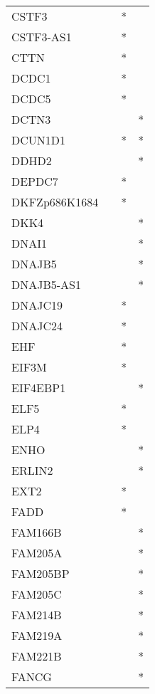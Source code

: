 \begin{longtable}{lccc}
CSTF3         &       &  * &         \\
CSTF3-AS1     &       &  * &         \\
CTTN          &       &  * &         \\
DCDC1         &       &  * &         \\
DCDC5         &       &  * &         \\
DCTN3         &       &    &       * \\
DCUN1D1       &       &  * &       * \\
DDHD2         &       &    &       * \\
DEPDC7        &       &  * &         \\
DKFZp686K1684 &       &  * &         \\
DKK4          &       &    &       * \\
DNAI1         &       &    &       * \\
DNAJB5        &       &    &       * \\
DNAJB5-AS1    &       &    &       * \\
DNAJC19       &       &  * &         \\
DNAJC24       &       &  * &         \\
EHF           &       &  * &         \\
EIF3M         &       &  * &         \\
EIF4EBP1      &       &    &       * \\
ELF5          &       &  * &         \\
ELP4          &       &  * &         \\
ENHO          &       &    &       * \\
ERLIN2        &       &    &       * \\
EXT2          &       &  * &         \\
FADD          &       &  * &         \\
FAM166B       &       &    &       * \\
FAM205A       &       &    &       * \\
FAM205BP      &       &    &       * \\
FAM205C       &       &    &       * \\
FAM214B       &       &    &       * \\
FAM219A       &       &    &       * \\
FAM221B       &       &    &       * \\
FANCG         &       &    &       * \\

\end{longtable}
